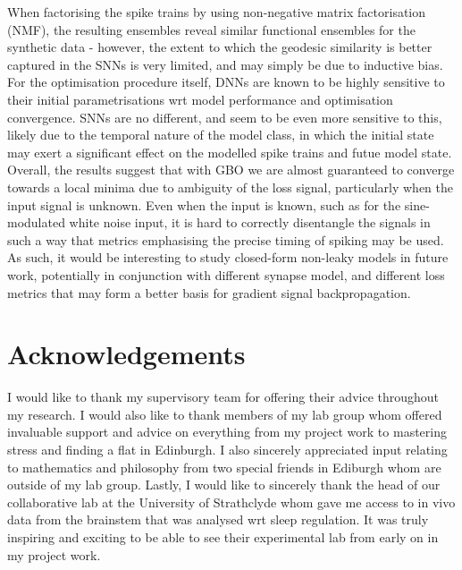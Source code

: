 \documentclass[mphil,deptreport,ianc]{infthesis} %
\begin{document}
\begin{preliminary}
{    When factorising the spike trains by using non-negative matrix factorisation (NMF), the resulting ensembles reveal similar functional ensembles for the synthetic data - however, the extent to which the geodesic similarity is better captured in the SNNs is very limited, and may simply be due to inductive bias.
    For the optimisation procedure itself, DNNs are known to be highly sensitive to their initial parametrisations wrt model performance and optimisation convergence.
    SNNs are no different, and seem to be even more sensitive to this, likely due to the temporal nature of the model class, in which the initial state may exert a significant effect on the modelled spike trains and futue model state.
    Overall, the results suggest that with GBO we are almost guaranteed to converge towards a local minima due to ambiguity of the loss signal, particularly when the input signal is unknown.
    Even when the input is known, such as for the sine-modulated white noise input, it is hard to correctly disentangle the signals in such a way that metrics emphasising the precise timing of spiking may be used.
    As such, it would be interesting to study closed-form non-leaky models in future work, potentially in conjunction with different synapse model, and different loss metrics that may form a better basis for gradient signal backpropagation.
}

\maketitle

\section*{Acknowledgements}

I would like to thank my supervisory team for offering their advice throughout my research.
I would also like to thank members of my lab group whom offered invaluable support and advice on everything from my project work to mastering stress and finding a flat in Edinburgh.
I also sincerely appreciated input relating to mathematics and philosophy from two special friends in Ediburgh whom are outside of my lab group.
Lastly, I would like to sincerely thank the head of our collaborative lab at the University of Strathclyde whom gave me access to in vivo data from the brainstem that was analysed wrt sleep regulation. It was truly inspiring and exciting to be able to see their experimental lab from early on in my project work.


\tableofcontents
\end{preliminary}
\end{document}
